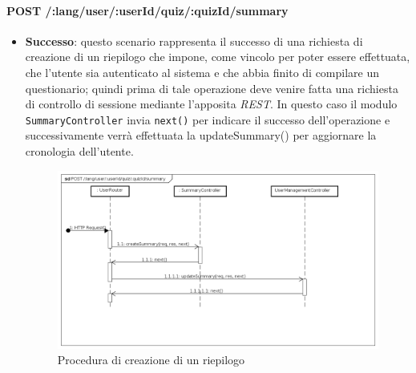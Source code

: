 \paragraph{POST /:lang/user/:userId/quiz/:quizId/summary} %
\begin{itemize}
\item \textbf{Successo}: questo scenario rappresenta il successo di una richiesta di creazione di un riepilogo che impone, come vincolo per poter essere effettuata, che l'utente sia autenticato al sistema e che abbia finito di compilare un questionario; quindi prima di tale operazione deve venire fatta una richiesta di controllo di sessione mediante l'apposita \textit{REST}. In questo caso il modulo \texttt{SummaryController} invia \texttt{next()} per indicare il successo dell'operazione e successivamente verrà effettuata la updateSummary() per aggiornare la cronologia dell'utente.
\label{Procedura di creazione di un riepilogo}
\begin{figure}[ht]
	\centering
	\includegraphics[scale=0.40]{UML/DiagrammiDiSequenza/Back-end/POST__lang_user_userId_quiz_quizId_summary_success.png}
	\caption{Procedura di creazione di un riepilogo}
\end{figure}
\FloatBarrier


\end{itemize}
